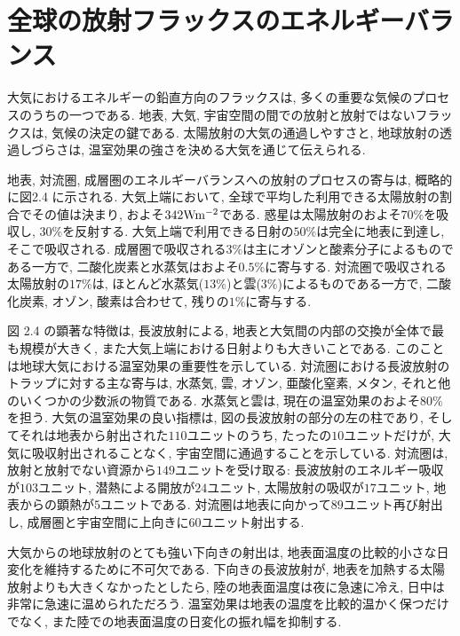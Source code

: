 \documentclass[a4j,12pt,openbib,oneside,dvipdfmx]{jbook}
\begin{document}
\newpage
{}
\section{全球の放射フラックスのエネルギーバランス}
大気におけるエネルギーの鉛直方向のフラックスは, 多くの重要な気候のプロセスのうちの一つである. 地表, 大気, 宇宙空間の間での放射と放射ではないフラックスは, 気候の決定の鍵である. 太陽放射の大気の通過しやすさと, 地球放射の透過しづらさは, 温室効果の強さを決める大気を通じて伝えられる.
\par
地表, 対流圏, 成層圏のエネルギーバランスへの放射のプロセスの寄与は, 概略的に図2.4 に示される. 大気上端において, 全球で平均した利用できる太陽放射の割合でその値は決まり, およそ$342 \rm{W}\rm{m}^{-2}$である. 
惑星は太陽放射のおよそ$70\%$を吸収し, $30\%$を反射する. 大気上端で利用できる日射の$50\%$は完全に地表に到達し, そこで吸収される. 成層圏で吸収される$3\%$は主にオゾンと酸素分子によるものである一方で, 二酸化炭素と水蒸気はおよそ$0.5\%$に寄与する. 
対流圏で吸収される太陽放射の$17\%$は, ほとんど水蒸気($13\%$)と雲($3\%$)によるものである一方で, 二酸化炭素, オゾン, 酸素は合わせて, 残りの$1\%$に寄与する. 
\par
図 2.4 の顕著な特徴は, 長波放射による, 地表と大気間の内部の交換が全体で最も規模が大きく, また大気上端における日射よりも大きいことである. 
このことは地球大気における温室効果の重要性を示している. 対流圏における長波放射のトラップに対する主な寄与は, 水蒸気, 雲, オゾン, 亜酸化窒素, メタン, それと他のいくつかの少数派の物質である. 水蒸気と雲は, 現在の温室効果のおよそ$80\%$を担う. 
大気の温室効果の良い指標は, 図の長波放射の部分の左の柱であり, そしてそれは地表から射出された$110$ユニットのうち, たったの$10$ユニットだけが, 大気に吸収射出されることなく, 宇宙空間に通過することを示している. 
対流圏は, 放射と放射でない資源から$149$ユニットを受け取る: 長波放射のエネルギー吸収が$103$ユニット, 潜熱による開放が$24$ユニット, 太陽放射の吸収が$17$ユニット, 地表からの顕熱が$5$ユニットである. 
対流圏は地表に向かって$89$ユニット再び射出し, 成層圏と宇宙空間に上向きに$60$ユニット射出する.
\par
大気からの地球放射のとても強い下向きの射出は, 地表面温度の比較的小さな日変化を維持するために不可欠である. 下向きの長波放射が, 地表を加熱する太陽放射よりも大きくなかったとしたら, 陸の地表面温度は夜に急速に冷え, 日中は非常に急速に温められただろう. 温室効果は地表の温度を比較的温かく保つだけでなく, また陸での地表面温度の日変化の振れ幅を抑制する.

\newpage
{}
\end{document}
